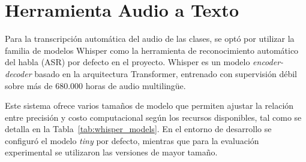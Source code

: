 \section{Herramienta Audio a Texto}
\label{section:5-1-Transcriber}

Para la transcripción automática del audio de las clases, se optó por utilizar la familia de modelos Whisper como la herramienta de reconocimiento automático del habla (ASR) por defecto en el proyecto. Whisper \cite{radford2022robust} es un modelo \textit{encoder-decoder} basado en la arquitectura Transformer, entrenado con supervisión débil sobre más de 680.000 horas de audio multilingüe.

Este sistema ofrece varios tamaños de modelo que permiten ajustar la relación entre precisión y costo computacional según los recursos disponibles, tal como se detalla en la Tabla~\ref{tab:whisper_models}. En el entorno de desarrollo se configuró el modelo \textit{tiny} por defecto, mientras que para la evaluación experimental se utilizaron las versiones de mayor tamaño.

\begin{table}[htbp]
\centering %
\caption{Características diferenciales entre los distintos tamaños de los modelos Whisper Whisper: Robust Speech Recognition via Large-Scale Weak Supervision \protect\footnote{\url{https://github.com/openai/whisper/blob/main/README.md}}. Se observa una relación directa: a menor cantidad de parámetros, menores son las exigencias de cómputo y memoria VRAM.}
\label{tab:whisper_models}
\end{table}

